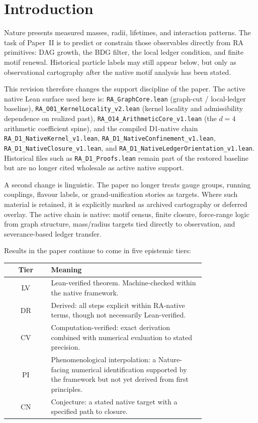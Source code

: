 \documentclass[11pt]{article}
\begin{document}
\section{Introduction}
\label{sec:intro}

Nature presents measured masses, radii, lifetimes, and interaction patterns. The task of Paper~II is to predict or constrain those observables directly from RA primitives: DAG growth, the BDG filter, the local ledger condition, and finite motif renewal. Historical particle labels may still appear below, but only as observational cartography after the native motif analysis has been stated.

This revision therefore changes the support discipline of the paper. The active native Lean surface used here is: \texttt{RA\_GraphCore.lean} (graph-cut / local-ledger baseline), \texttt{RA\_O01\_KernelLocality\_v2.lean} (kernel locality and admissibility dependence on realized past), \texttt{RA\_O14\_ArithmeticCore\_v1.lean} (the $d=4$ arithmetic coefficient spine), and the compiled D1-native chain \texttt{RA\_D1\_NativeKernel\_v1.lean}, \texttt{RA\_D1\_NativeConfinement\_v1.lean}, \texttt{RA\_D1\_NativeClosure\_v1.lean}, and \texttt{RA\_D1\_NativeLedgerOrientation\_v1.lean}. Historical files such as \texttt{RA\_D1\_Proofs.lean} remain part of the restored baseline but are no longer cited wholesale as active native support.

A second change is linguistic. The paper no longer treats gauge groups, running couplings, flavour labels, or grand-unification stories as targets. Where such material is retained, it is explicitly marked as archived cartography or deferred overlay. The active chain is native: motif census, finite closure, force-range logic from graph structure, mass/radius targets tied directly to observation, and severance-based ledger transfer.

Results in the paper continue to come in five epistemic tiers:

\begin{center}
\begin{tabular}{cp{0.78\linewidth}}
\toprule
Tier & Meaning \\
\midrule
LV & Lean-verified theorem. Machine-checked within the native framework. \\
DR & Derived: all steps explicit within RA-native terms, though not necessarily Lean-verified. \\
CV & Computation-verified: exact derivation combined with numerical evaluation to stated precision. \\
PI & Phenomenological interpolation: a Nature-facing numerical identification supported by the framework but not yet derived from first principles. \\
CN & Conjecture: a stated native target with a specified path to closure. \\
\bottomrule
\end{tabular}
\end{center}
\end{document}
